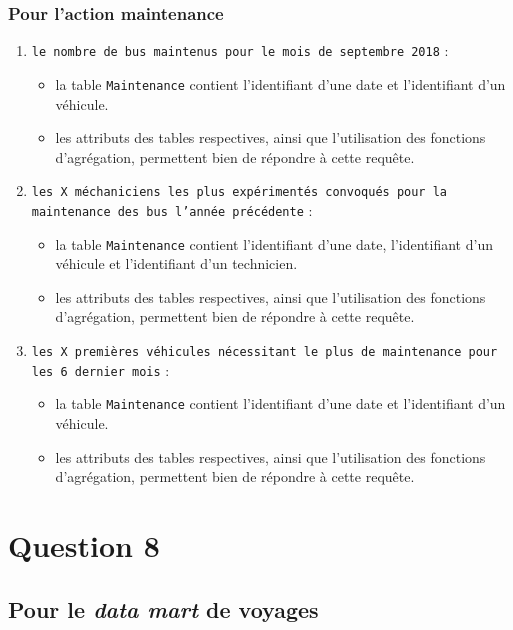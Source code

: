\documentclass[a4paper,12pt]{report}
\begin{document}
\subsubsection{Pour l'action \og maintenance \fg}
\begin{enumerate}
  \item \texttt{le nombre de bus maintenus pour le mois de septembre 2018} :
  \begin{itemize}
    \item la table \texttt{Maintenance} contient l'identifiant d'une date et l'identifiant d'un véhicule.
    \item les attributs des tables respectives, ainsi que l'utilisation des fonctions d'agrégation, permettent bien de répondre à cette requête.
  \end{itemize}
  \item \texttt{les X méchaniciens les plus expérimentés convoqués pour la maintenance des bus l'année précédente} :
  \begin{itemize}
    \item la table \texttt{Maintenance} contient l'identifiant d'une date, l'identifiant d'un véhicule et l'identifiant d'un technicien.
    \item les attributs des tables respectives, ainsi que l'utilisation des fonctions d'agrégation, permettent bien de répondre à cette requête.
  \end{itemize}
  \item \texttt{les X premières véhicules nécessitant le plus de maintenance pour les 6 dernier mois} :
  \begin{itemize}
    \item la table \texttt{Maintenance} contient l'identifiant d'une date et l'identifiant d'un véhicule.
    \item les attributs des tables respectives, ainsi que l'utilisation des fonctions d'agrégation, permettent bien de répondre à cette requête.
  \end{itemize}
\end{enumerate}

\section*{Question 8}
\label{sec:question_8}

\subsection*{Pour le \textit{data mart} de \og voyages \fg}
\label{subsec:question_8_voyages}
\end{document}
